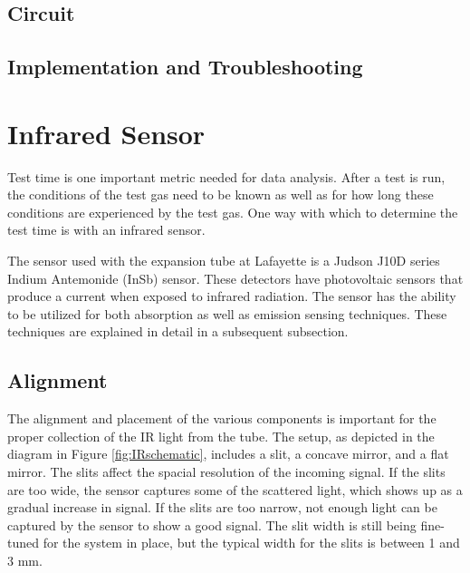 
\subsection{Circuit}




\subsection{Implementation and Troubleshooting}





\section{Infrared Sensor}

Test time is one important metric needed for data analysis. After a test is run, the conditions of the test gas need to be known as well as for how long these conditions are experienced by the test gas. One way with which to determine the test time is with an infrared sensor. 

The sensor used with the expansion tube at Lafayette is a Judson J10D series Indium Antemonide (InSb) sensor. These detectors have photovoltaic sensors that produce a current when exposed to infrared radiation. The sensor has the ability to be utilized for both absorption as well as emission sensing techniques. These techniques are explained in detail in a subsequent subsection.


\subsection{Alignment}
The alignment and placement of the various components is important for the proper collection of the IR light from the tube. The setup, as depicted in the diagram in Figure \ref{fig:IRschematic}, includes a slit, a concave mirror, and a flat mirror. The slits affect the spacial resolution of the incoming signal. If the slits are too wide, the sensor captures some of the scattered light, which shows up as a gradual increase in signal. If the slits are too narrow, not enough light can be captured by the sensor to show a good signal. The slit width is still being fine-tuned for the system in place, but the typical width for the slits is between 1 and 3 mm. 


